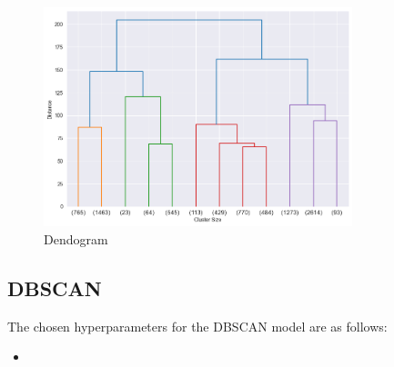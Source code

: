 \begin{figure}[H]
    \centering
    \includegraphics[width=0.8\textwidth]{src/figs/dendogram.png} 
    \caption{Dendogram}\label{fig:dendogram}
\end{figure}

\subsection{DBSCAN}

The chosen hyperparameters for the DBSCAN model are as follows:

\begin{itemize}
    \item 
\end{itemize}